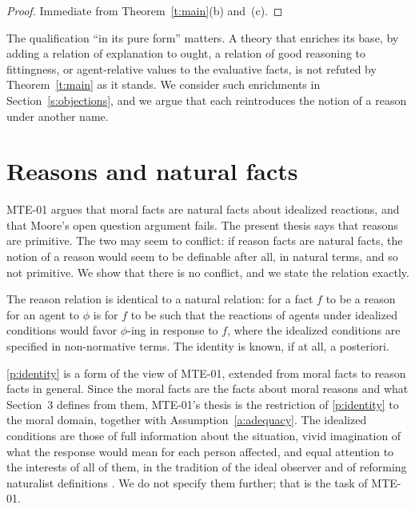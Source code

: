 \documentclass{situationist-preprint}
\begin{document}
\begin{proof}
Immediate from Theorem~\ref{t:main}(b) and~(c).
\end{proof}

The qualification \enquote{in its pure form} matters. A theory that enriches its base, by adding a relation of explanation to ought, a relation of good reasoning to fittingness, or agent-relative values to the evaluative facts, is not refuted by Theorem~\ref{t:main} as it stands. We consider such enrichments in Section~\ref{s:objections}, and we argue that each reintroduces the notion of a reason under another name.

\section{Reasons and natural facts}\label{s:natural}

MTE-01 argues that moral facts are natural facts about idealized reactions, and that Moore's open question argument fails. The present thesis says that reasons are primitive. The two may seem to conflict: if reason facts are natural facts, the notion of a reason would seem to be definable after all, in natural terms, and so not primitive. We show that there is no conflict, and we state the relation exactly.

\begin{principle}[Identity]\label{p:identity}
The reason relation is identical to a natural relation: for a fact $f$ to be a reason for an agent to $\phi$ is for $f$ to be such that the reactions of agents under idealized conditions would favor $\phi$-ing in response to $f$, where the idealized conditions are specified in non-normative terms. The identity is known, if at all, a posteriori.
\end{principle}

\ref{p:identity} is a form of the view of MTE-01, extended from moral facts to reason facts in general. Since the moral facts are the facts about moral reasons and what Section~3 defines from them, MTE-01's thesis is the restriction of \ref{p:identity} to the moral domain, together with Assumption~\ref{a:adequacy}. The idealized conditions are those of full information about the situation, vivid imagination of what the response would mean for each person affected, and equal attention to the interests of all of them, in the tradition of the ideal observer \citep{Firth1952} and of reforming naturalist definitions \citep{Railton1986}. We do not specify them further; that is the task of MTE-01.
\end{document}
